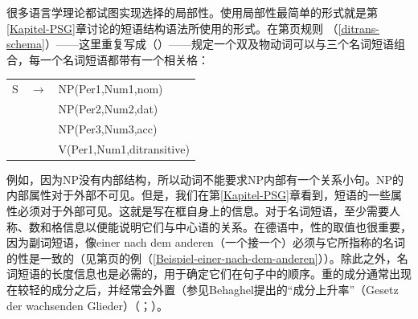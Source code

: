 很多语言学理论都试图实现选择的局部性。使用局部性最简单的形式就是第\ref{Kapitel-PSG}章讨论的短语结构语法所使用的形式。在第\pageref{ditrans-schema}页规则 （\ref{ditrans-schema}）——这里重复写成（）——规定一个双及物动词可以与三个名词短语组合，每一个名词短语都带有一个相关格：
\ea
\begin{tabular}[t]{@{}l@{ }l@{ }l}
S  & $\to$ & NP({Per1},{Num1},{nom}) \\
   &       & NP(Per2,Num2,{dat})\\
   &       & NP(Per3,Num3,{acc})\\
   &       & V({Per1},{Num1},ditransitive)\\
\end{tabular}
\z
例如，因为NP没有内部结构，所以动词不能要求NP内部有一个关系小句。NP的内部属性对于外部不可见。但是，我们在第\ref{Kapitel-PSG}章看到，短语的一些属性必须对于外部可见。这就是写在框自身上的信息。对于名词短语，至少需要人称、数和格信息以便能说明它们与中心语的关系。在德语中，性的取值也很重要，因为副词短语，像einer nach dem anderen（一个接一个）必须与它所指称的名词的性是一致的（见第\pageref{Beispiel-einer-nach-dem-anderen}页的例（\ref{Beispiel-einer-nach-dem-anderen}））。除此之外，名词短语的长度信息也是必需的，用于确定它们在句子中的顺序。重的成分通常出现在较轻的成分之后，并经常会外置（参见Behaghel提出的“成分上升率”（Gesetz der wachsenden Glieder）（\citeyear[]{Behaghel09}；\citeyear[]{Behaghel30}）。 

